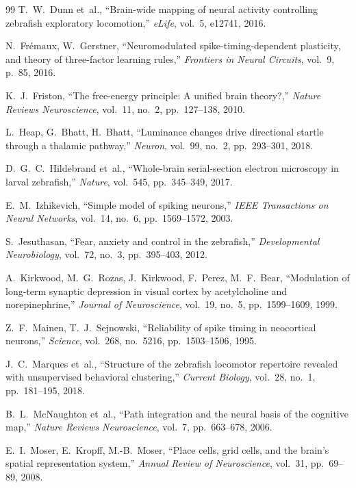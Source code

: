 \documentclass[11pt,a4paper]{article}
\begin{document}
\begin{thebibliography}{99}
  T.~W.~Dunn et~al.,
  ``Brain-wide mapping of neural activity controlling zebrafish exploratory
  locomotion,''
  \textit{eLife}, vol.~5, e12741, 2016.

  N.~Fr\'{e}maux, W.~Gerstner,
  ``Neuromodulated spike-timing-dependent plasticity, and theory of
  three-factor learning rules,''
  \textit{Frontiers in Neural Circuits}, vol.~9, p.~85, 2016.

  K.~J.~Friston,
  ``The free-energy principle: A unified brain theory?,''
  \textit{Nature Reviews Neuroscience}, vol.~11, no.~2, pp.~127--138, 2010.

  L.~Heap, G.~Bhatt, H.~Bhatt,
  ``Luminance changes drive directional startle through a thalamic pathway,''
  \textit{Neuron}, vol.~99, no.~2, pp.~293--301, 2018.

  D.~G.~C.~Hildebrand et~al.,
  ``Whole-brain serial-section electron microscopy in larval zebrafish,''
  \textit{Nature}, vol.~545, pp.~345--349, 2017.

  E.~M.~Izhikevich,
  ``Simple model of spiking neurons,''
  \textit{IEEE Transactions on Neural Networks},
  vol.~14, no.~6, pp.~1569--1572, 2003.

  S.~Jesuthasan,
  ``Fear, anxiety and control in the zebrafish,''
  \textit{Developmental Neurobiology}, vol.~72, no.~3, pp.~395--403, 2012.

  A.~Kirkwood, M.~G.~Rozas, J.~Kirkwood, F.~Perez, M.~F.~Bear,
  ``Modulation of long-term synaptic depression in visual cortex by
  acetylcholine and norepinephrine,''
  \textit{Journal of Neuroscience}, vol.~19, no.~5, pp.~1599--1609, 1999.

  Z.~F.~Mainen, T.~J.~Sejnowski,
  ``Reliability of spike timing in neocortical neurons,''
  \textit{Science}, vol.~268, no.~5216, pp.~1503--1506, 1995.

  J.~C.~Marques et~al.,
  ``Structure of the zebrafish locomotor repertoire revealed with
  unsupervised behavioral clustering,''
  \textit{Current Biology}, vol.~28, no.~1, pp.~181--195, 2018.

  B.~L.~McNaughton et~al.,
  ``Path integration and the neural basis of the cognitive map,''
  \textit{Nature Reviews Neuroscience}, vol.~7, pp.~663--678, 2006.

  E.~I.~Moser, E.~Kropff, M.-B.~Moser,
  ``Place cells, grid cells, and the brain's spatial representation system,''
  \textit{Annual Review of Neuroscience}, vol.~31, pp.~69--89, 2008.


\end{thebibliography}
\end{document}
